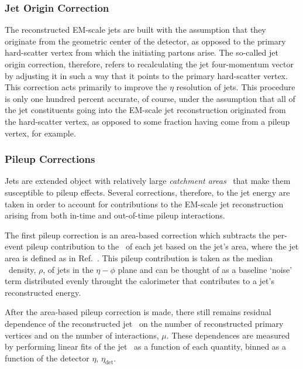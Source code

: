\subsubsection{Jet Origin Correction}
\label{sec:jet_origin_correction}

The reconstructed EM-scale jets are built with the assumption that they originate from the geometric center
of the detector, as opposed to the primary hard-scatter vertex from which the initiating partons arise.
The so-called jet origin correction, therefore, refers to recalculating the jet four-momentum vector by adjusting it
in such a way that it points to the primary hard-scatter vertex.
This correction acts primarily to improve the $\eta$ resolution of jets.
This procedure is only one hundred percent accurate, of course, under the assumption that all of the jet constituents
going into the EM-scale jet reconstruction originated from the hard-scatter vertex, as opposed to some fraction having come from
a pileup vertex, for example.

\subsubsection{Pileup Corrections}
\label{sec:jet_pileup_correction}

Jets are extended object with relatively large \textit{catchment areas}~\cite{Cacciari:2008gn} that make them susceptible to
pileup effects.
Several corrections, therefore, to the jet energy are taken in order to account for contributions to the EM-scale jet reconstruction
arising from both in-time and out-of-time pileup interactions.

The first pileup correction is an area-based correction which subtracts the per-event pileup contribution to the
\pT~of each jet based on the jet's area, where the jet area is defined as in Ref.~\cite{Cacciari:2008gn}.
This pileup contribution is taken as the median \pT~density, $\rho$, of jets in the $\eta-\phi$ plane and
can be thought of as a baseline `noise' term distributed evenly throught the calorimeter that contributes to a jet's reconstructed energy.

After the area-based pileup correction is made, there still remains residual dependence of the reconstructed jet \pT~on the
number of reconstructed primary vertices and on the number of interactions, $\mu$.
These dependences are measured by performing linear fits of the jet \pT~as a function of each quantity, binned as a function of the detector $\eta$, $\eta_{\text{det}}$.


